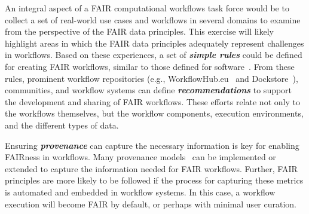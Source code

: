 An integral aspect of a FAIR computational workflows task force would be to collect a set of real-world use cases and workflows in several domains to examine from the perspective of the FAIR data principles. This exercise will likely highlight areas in which the FAIR data principles adequately represent challenges in workflows. Based on these experiences, a set of \textbf{\emph{simple rules}} could be defined for creating FAIR workflows, similar to those defined for software~\cite{monteil2020nine}. From these rules, 
prominent workflow repositories (e.g., WorkflowHub.eu~\cite{workflowhub} and Dockstore~\cite{yuen2021dockstore}), communities, and workflow systems can define \textbf{\emph{recommendations}} to support the development and sharing of FAIR workflows. These efforts relate not only to the workflows themselves, but the workflow components, execution environments, and the different types of data.

Ensuring \textbf{\emph{provenance}} can capture the necessary information is key for enabling FAIRness in workflows. Many provenance models~\cite{oliveira2018provenance} can be implemented or extended to capture the information needed for FAIR workflows. Further, FAIR principles are more likely to be followed if the process for capturing these metrics is automated and embedded in workflow systems. In this case, a workflow execution will become FAIR by default, or perhaps with minimal user curation.
